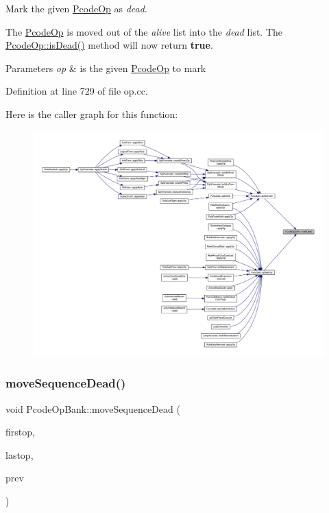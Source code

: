 Mark the given \mbox{\hyperlink{class_pcode_op}{Pcode\+Op}} as {\itshape dead}. 

The \mbox{\hyperlink{class_pcode_op}{Pcode\+Op}} is moved out of the {\itshape alive} list into the {\itshape dead} list. The \mbox{\hyperlink{class_pcode_op_a6b24e6d10c6a0cde774cf52e816a636d}{Pcode\+Op\+::is\+Dead()}} method will now return {\bfseries{true}}. 
\begin{DoxyParams}{Parameters}
{\em op} & is the given \mbox{\hyperlink{class_pcode_op}{Pcode\+Op}} to mark \\
\hline
\end{DoxyParams}


Definition at line 729 of file op.\+cc.

Here is the caller graph for this function\+:
\nopagebreak
\begin{figure}[H]
\begin{center}
\leavevmode
\includegraphics[width=350pt]{class_pcode_op_bank_ad4e924e79e478b3f867a4da3ba6d6c56_icgraph}
\end{center}
\end{figure}
\mbox{\label{class_pcode_op_bank_a64514bb8cab2719f46a03dfe9c7b7a59}} 
\subsubsection{\texorpdfstring{moveSequenceDead()}{moveSequenceDead()}}
{\footnotesize\ttfamily void Pcode\+Op\+Bank\+::move\+Sequence\+Dead (\begin{DoxyParamCaption}\item[{\mbox{\hyperlink{class_pcode_op}{Pcode\+Op}} $\ast$}]{firstop,  }\item[{\mbox{\hyperlink{class_pcode_op}{Pcode\+Op}} $\ast$}]{lastop,  }\item[{\mbox{\hyperlink{class_pcode_op}{Pcode\+Op}} $\ast$}]{prev }\end{DoxyParamCaption})}



